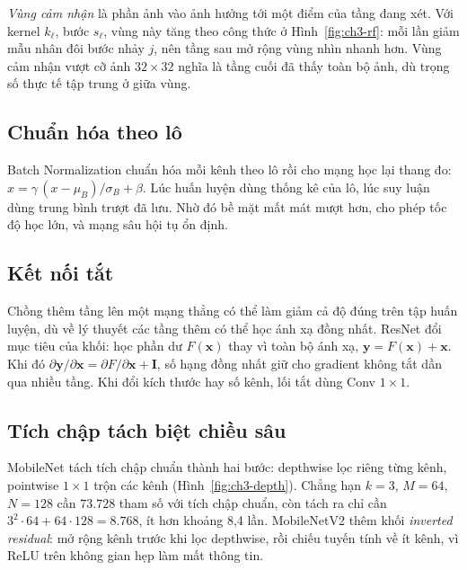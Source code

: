 \emph{Vùng cảm nhận} là phần ảnh vào ảnh hưởng tới một điểm của tầng đang xét. Với kernel $k_\ell$, bước $s_\ell$, vùng này tăng theo công thức ở Hình~\ref{fig:ch3-rf}: mỗi lần giảm mẫu nhân đôi bước nhảy $j$, nên tầng sau mở rộng vùng nhìn nhanh hơn. Vùng cảm nhận vượt cỡ ảnh $32{\times}32$ nghĩa là tầng cuối đã thấy toàn bộ ảnh, dù trọng số thực tế tập trung ở giữa vùng.


\subsection{Chuẩn hóa theo lô}
Batch Normalization \cite{ch3-ioffe2015} chuẩn hóa mỗi kênh theo lô rồi cho mạng học lại thang đo: $\hat{x}=\gamma\,(x-\mu_B)/\sigma_B+\beta$. Lúc huấn luyện dùng thống kê của lô, lúc suy luận dùng trung bình trượt đã lưu. Nhờ đó bề mặt mất mát mượt hơn, cho phép tốc độ học lớn, và mạng sâu hội tụ ổn định.

\subsection{Kết nối tắt}
Chồng thêm tầng lên một mạng thẳng có thể làm giảm cả độ đúng trên tập huấn luyện, dù về lý thuyết các tầng thêm có thể học ánh xạ đồng nhất. ResNet \cite{ch3-he2016} đổi mục tiêu của khối: học phần dư $F(\mathbf{x})$ thay vì toàn bộ ánh xạ, $\mathbf{y}=F(\mathbf{x})+\mathbf{x}$. Khi đó $\partial\mathbf{y}/\partial\mathbf{x}=\partial F/\partial\mathbf{x}+\mathbf{I}$, số hạng đồng nhất giữ cho gradient không tắt dần qua nhiều tầng. Khi đổi kích thước hay số kênh, lối tắt dùng Conv $1{\times}1$.

\subsection{Tích chập tách biệt chiều sâu}
MobileNet \cite{ch3-howard2017} tách tích chập chuẩn thành hai bước: depthwise lọc riêng từng kênh, pointwise $1{\times}1$ trộn các kênh (Hình~\ref{fig:ch3-depth}). Chẳng hạn $k=3$, $M=64$, $N=128$ cần $73.728$ tham số với tích chập chuẩn, còn tách ra chỉ cần $3^2\cdot64+64\cdot128=8.768$, ít hơn khoảng 8,4 lần. MobileNetV2 \cite{ch3-sandler2018} thêm khối \emph{inverted residual}: mở rộng kênh trước khi lọc depthwise, rồi chiếu tuyến tính về ít kênh, vì ReLU trên không gian hẹp làm mất thông tin.

